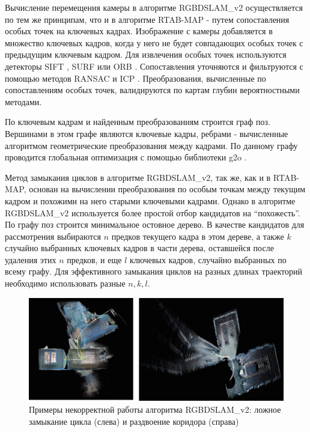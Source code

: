 \documentclass{mipt-thesis-ms}
\begin{document}
	Вычисление перемещения камеры в алгоритме RGBDSLAM\_v2 осуществляется по тем же принципам, что и в алгоритме RTAB-MAP - путем сопоставления особых точек на ключевых кадрах. Изображение с камеры добавляется в множество ключевых кадров, когда у него не будет совпадающих особых точек с предыдущим ключевым кадром. Для извлечения особых точек используются детекторы SIFT \cite{lowe2004distinctive}, SURF \cite{bay2006surf} или ORB \cite{rublee2011orb}. Сопоставления уточняются и фильтруются с помощью методов RANSAC \cite{brachmann2017dsac} и ICP \cite{chetverikov2005robust}. Преобразования, вычисленные по сопоставлениям особых точек, валидируются по картам глубин вероятностными методами.
	
	По ключевым кадрам и найденным преобразованиям строится граф поз. Вершинами в этом графе являются ключевые кадры, ребрами - вычисленные алгоритмом геометрические преобразования между кадрами. По данному графу проводится глобальная оптимизация с помощью библиотеки g2o \cite{grisetti2011g2o}.
	
	Метод замыкания циклов в алгоритме RGBDSLAM\_v2, так же, как и в RTAB-MAP, основан на вычислении преобразования по особым точкам между текущим кадром и похожими на него старыми ключевыми кадрами. Однако в алгоритме RGBDSLAM\_v2 используется более простой отбор кандидатов на ``похожесть''. По графу поз строится минимальное остовное дерево. В качестве кандидатов для рассмотрения выбираются $n$ предков текущего кадра в этом дереве, а также $k$ случайно выбранных ключевых кадров в части дерева, оставшейся после удаления этих $n$ предков, и еще $l$ ключевых кадров, случайно выбранных по всему графу. Для эффективного замыкания циклов на разных длинах траекторий необходимо использовать разные $n, k, l$.
	
	\begin{figure}
		\includegraphics[width=1.0\textwidth]{img/rgbdslam_fails.png}
		\caption{Примеры некорректной работы алгоритма RGBDSLAM\_v2: ложное замыкание цикла (слева) и раздвоение коридора (справа)}
		\label{figure_rgbdslam_fails}
	\end{figure}
	
\end{document}
